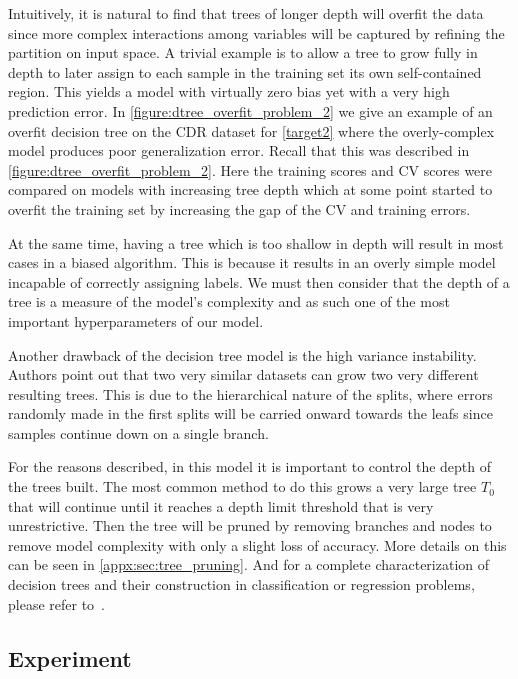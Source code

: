 Intuitively, it is natural to find that trees of longer depth will overfit the data since more complex interactions among variables will be captured by refining the partition on input space.
A trivial example is to allow a tree to grow fully in depth to later assign to each sample in the training set its own self-contained region.
This yields a model with virtually zero bias yet with a very high prediction error.
In \cref{figure:dtree_overfit_problem_2} we give an example of an overfit decision tree on the CDR dataset for \cref{target2} where the overly-complex model produces poor generalization error. 
Recall that this was described in \cref{figure:dtree_overfit_problem_2}.
Here the training scores and CV scores were compared on models with increasing tree depth which at some point started to overfit the training set by increasing the gap of the CV and training errors.

At the same time, having a tree which is too shallow in depth will result in most cases in a biased algorithm.
This is because it results in an overly simple model incapable of correctly assigning labels.
We must then consider that the depth of a tree is a measure of the model's complexity and as such one of the most important hyperparameters of our model.

Another drawback of the decision tree model is the high variance instability.
Authors point out that two very similar datasets can grow two very different resulting trees.
This is due to the hierarchical nature of the splits, where errors randomly made in the first splits will be carried onward towards the leafs since samples continue down on a single branch.

For the reasons described, in this model it is important to control the depth of the trees built.
The most common method to do this grows a very large tree $T_0$ that will continue until it reaches a depth limit threshold that is very unrestrictive.
Then the tree will be pruned by removing branches and nodes to remove model complexity with only a slight loss of accuracy. 
More details on this can be seen in \cref{appx:sec:tree_pruning}.
And for a complete characterization of decision trees and their construction in classification or regression problems, please refer to~\cite{breiman-cart84}.

\subsection{Experiment}\label{subsection:decision_trees_experiment}

